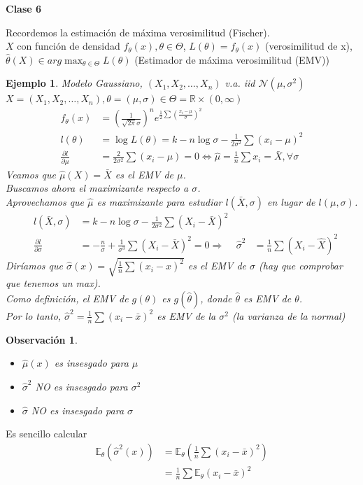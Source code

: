 \documentclass[10pt]{article}
\theoremstyle{plain}
\newtheorem{obs}{Observación}
\newtheorem{ej}{Ejemplo}
\theoremstyle{definition}
\newcommand{\catnum}{6} %
\begin{document}
\begin{center}
\LARGE\textbf{Clase \catnum}
\end{center}
Recordemos la estimación de máxima verosimilitud (Fischer).\\
$X$ con función de densidad $f_{\theta}(x), \theta \in \Theta$, $L(\theta) = f_{\theta}(x)$ (verosimilitud de x), $\hat{\theta}(X) \in arg\max_{\theta \in \Theta} L(\theta)$ (Estimador de máxima verosimilitud (EMV))
\begin{ej} Modelo Gaussiano, $(X_{1},X_{2},\ldots,X_{n})$ v.a. iid $\mathcal{N}(\mu, \sigma^2)$\\
$X = (X_{1},X_{2},\ldots,X_{n}), \theta = (\mu, \sigma) \in \Theta = \mathbb{R}\times (0,\infty)$
\begin{align*}
f_{\theta}(x) &= \left(\frac{1}{\sqrt{2\pi}\sigma}\right)^n e^{\frac{1}{2}\sum\left(\frac{x_{i}-\mu}{\sigma}\right)^2}\\
l(\theta) &= \log L(\theta) = k - n\log \sigma - \frac{1}{2\sigma^2}\sum\left(x_{i}-\mu\right)^2\\
\frac{\partial l}{\partial \mu} &= \frac{2}{2\sigma^2}\sum (x_{i}-\mu) = 0 \Leftrightarrow \hat{\mu} = \frac{1}{n}\sum x_{i} = \bar{X}, \forall \sigma
\end{align*}
Veamos que $\hat{\mu}(X) = \bar{X}$ es el EMV de $\mu$.\\
Buscamos ahora el maximizante respecto a $\sigma$.\\
Aprovechamos que $\hat{\mu}$ es maximizante para estudiar $l(\bar{X},\sigma)$ en lugar de $l(\mu, \sigma)$.\\
\begin{align*}
&l(\bar{X}, \sigma) &= k - n\log \sigma - \frac{1}{2\sigma^2}\sum(X_{i}-\bar{X})^2\\
&\frac{\partial l}{\partial \sigma} &= -\frac{n}{\sigma} + \frac{1}{\sigma^3}\sum (X_{i}-\bar{X})^2 = 0
\Rightarrow & \hat{\sigma}^2 &= \frac{1}{n}\sum (X_{i}-\hat{X})^2
\end{align*}
Diríamos que $\hat{\sigma}(x) = \sqrt{\frac{1}{n}\sum (x_{i}-\hat{x})^2}$ es el EMV de $\sigma$ (hay que comprobar que tenemos un max).\\
Como definición, el EMV de $g(\theta)$ es $g(\hat{\theta})$, donde $\hat{\theta}$ es EMV de $\theta$.\\
Por lo tanto, $\hat{\sigma}^2 = \frac{1}{n}\sum(x_{i}-\bar{x})^2$ es EMV de la $\sigma^2$ (la varianza de la normal)
\end{ej}
\begin{obs}
\begin{itemize}
\item $\hat{\mu}(x)$ es insesgado para $\mu$
\item $\hat{\sigma}^2$ NO es insesgado para $\sigma^2$
\item $\hat{\sigma}$ NO es insesgado para $\sigma$
\end{itemize}
\end{obs}
Es sencillo calcular
\begin{align*}
\mathbb{E}_{\theta}(\hat{\sigma}^2(x)) &= \mathbb{E}_{\theta}(\frac{1}{n}\sum (x_{i}-\bar{x})^2)\\
&= \frac{1}{n}\sum \mathbb{E}_{\theta} (x_{i}-\bar{x})^2
\end{align*}
\end{document}
